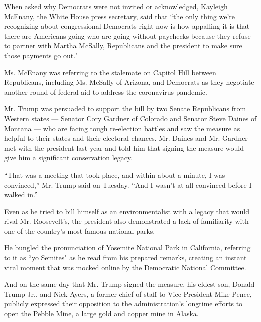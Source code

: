 When asked why Democrats were not invited or acknowledged, Kayleigh
McEnany, the White House press secretary, said that ``the only thing
we're recognizing about congressional Democrats right now is how
appalling it is that there are Americans going who are going without
paychecks because they refuse to partner with Martha McSally,
Republicans and the president to make sure those payments go out."

Ms. McEnany was referring to the
\href{https://www.nytimes3xbfgragh.onion/2020/08/04/us/politics/coronavirus-recovery-plan-negotiations.html}{stalemate
on Capitol Hill} between Republicans, including Ms. McSally of Arizona,
and Democrats as they negotiate another round of federal aid to address
the coronavirus pandemic.

Mr. Trump was
\href{https://www.nytimes3xbfgragh.onion/2020/07/22/us/politics/land-water-conservation-fund.html}{persuaded
to support the bill} by two Senate Republicans from Western states ---
Senator Cory Gardner of Colorado and Senator Steve Daines of Montana ---
who are facing tough re-election battles and saw the measure as helpful
to their states and their electoral chances. Mr. Daines and Mr. Gardner
met with the president last year and told him that signing the measure
would give him a significant conservation legacy.

``That was a meeting that took place, and within about a minute, I was
convinced,'' Mr. Trump said on Tuesday. ``And I wasn't at all convinced
before I walked in.''

Even as he tried to bill himself as an environmentalist with a legacy
that would rival Mr. Roosevelt's, the president also demonstrated a lack
of familiarity with one of the country's most famous national parks.

He
\href{https://www.nytimes3xbfgragh.onion/video/us/100000007272140/trump-stumbles-over-yosemite.html}{bungled
the pronunciation} of Yosemite National Park in California, referring to
it as ``yo Semites" as he read from his prepared remarks, creating an
instant viral moment that was mocked online by the Democratic National
Committee.

And on the same day that Mr. Trump signed the measure, his eldest son,
Donald Trump Jr., and Nick Ayers, a former chief of staff to Vice
President Mike Pence,
\href{https://twitter.com/DonaldJTrumpJr/status/1290723762523045888}{publicly
expressed their opposition} to the administration's longtime efforts to
open the Pebble Mine, a large gold and copper mine in Alaska.

